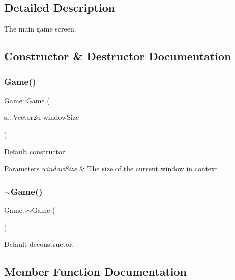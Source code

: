\subsection{Detailed Description}
The main game screen. 

\subsection{Constructor \& Destructor Documentation}
\mbox{\label{class_game_ae52380ebfe491f30627f4b334f516c77}} 
\subsubsection{\texorpdfstring{Game()}{Game()}}
{\footnotesize\ttfamily Game\+::\+Game (\begin{DoxyParamCaption}\item[{sf\+::\+Vector2u}]{window\+Size }\end{DoxyParamCaption})}



Default constructor. 


\begin{DoxyParams}{Parameters}
{\em window\+Size} & The size of the current window in context \\
\hline
\end{DoxyParams}
\mbox{\label{class_game_ae3d112ca6e0e55150d2fdbc704474530}} 
\subsubsection{\texorpdfstring{$\sim$\+Game()}{~Game()}}
{\footnotesize\ttfamily Game\+::$\sim$\+Game (\begin{DoxyParamCaption}{ }\end{DoxyParamCaption})}



Default deconstructor. 



\subsection{Member Function Documentation}
\mbox{\label{class_game_a04c9d598d2fea43a079b95290e305c8f}} 
